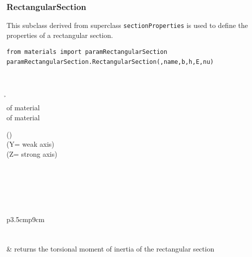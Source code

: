 \subsubsection{RectangularSection}
\noindent This subclass derived from superclass {\tt sectionProperties} is used to define the properties of a rectangular section.
\begin{verbatim}
from materials import paramRectangularSection
paramRectangularSection.RectangularSection(,name,b,h,E,nu)
\end{verbatim}
\begin{paramClassTable}
 \\
\bX{} \\
\h{} \\
\E{} of material\\
\nuX of material \\
\end{paramClassTable}
\begin{methodsTable}
\A(){} \\
\Iy{()}  (Y= weak axis)\\
\Iz{()}  (Z= strong axis)\\
\J{()} \\
\Wyel{()}\\
\Wzel{()} \\
\alphaY{()}\\
\alphaZ{()}\\
\end{methodsTable}

\begin{center}
\begin{tabular}{p{3.5cm}p{9cm}}
 \\
 \\
 \\
& returns the torsional moment of inertia of the rectangular section \\
\end{tabular}
\end{center}

